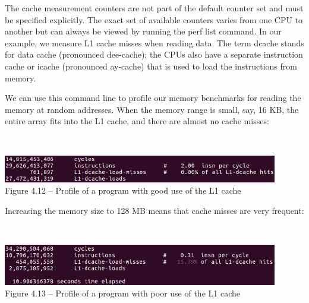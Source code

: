 
The cache measurement counters are not part of the default counter set and must be specified explicitly. The exact set of available counters varies from one CPU to another but can always be viewed by running the perf list command. In our example, we measure L1 cache misses when reading data. The term dcache stands for data cache (pronounced dee-cache); the CPUs also have a separate instruction cache or icache (pronounced ay-cache) that is used to load the instructions from memory.

We can use this command line to profile our memory benchmarks for reading the memory at random addresses. When the memory range is small, say, 16 KB, the entire array fits into the L1 cache, and there are almost no cache misses:

\hspace*{\fill} \\ %
\begin{center}
\includegraphics[width=0.9\textwidth]{content/1/chapter4/images/12.jpg}\\
Figure 4.12 – Profile of a program with good use of the L1 cache
\end{center}

Increasing the memory size to 128 MB means that cache misses are very frequent:

\hspace*{\fill} \\ %
\begin{center}
\includegraphics[width=0.9\textwidth]{content/1/chapter4/images/13.jpg}\\
Figure 4.13 – Profile of a program with poor use of the L1 cache
\end{center}

